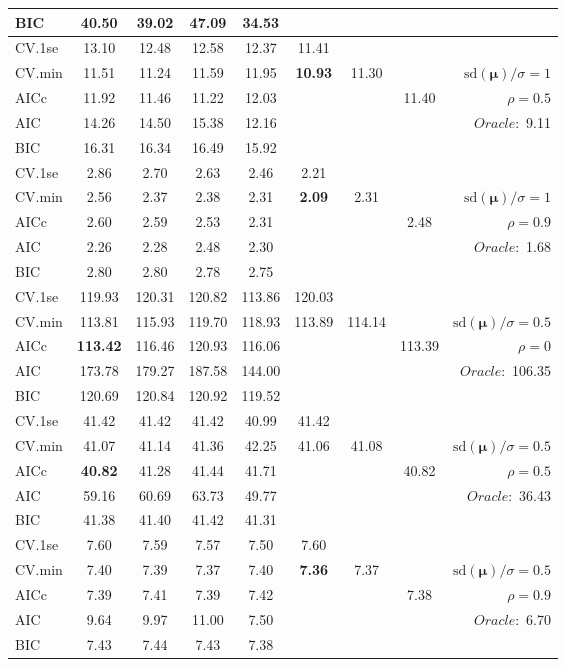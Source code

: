 \begin{table}
\begin{center}
\begin{tabular}{l*{7}{c}|r}
BIC & 40.50 & 39.02 & 47.09 & 34.53 & & & &  \\
 \hline 
CV.1se & 13.10 & 12.48 & 12.58 & 12.37 & 11.41 & & & \\
CV.min & 11.51 & 11.24 & 11.59 & 11.95 & {\bf 10.93} & 11.30 & & $\mathrm{sd}(\mathbf{\mu})/\sigma=1$ \\
AICc & 11.92 & 11.46 & 11.22 & 12.03 & & & 11.40 &  $\rho=0.5$ \\
AIC & 14.26 & 14.50 & 15.38 & 12.16 & & & &  \multirow{2}{*}{$Oracle: $ 9.11} \\
BIC & 16.31 & 16.34 & 16.49 & 15.92 & & & &  \\
 \hline 
CV.1se & 2.86 & 2.70 & 2.63 & 2.46 & 2.21 & & & \\
CV.min & 2.56 & 2.37 & 2.38 & 2.31 & {\bf 2.09} & 2.31 & & $\mathrm{sd}(\mathbf{\mu})/\sigma=1$ \\
AICc & 2.60 & 2.59 & 2.53 & 2.31 & & & 2.48 &  $\rho=0.9$ \\
AIC & 2.26 & 2.28 & 2.48 & 2.30 & & & &  \multirow{2}{*}{$Oracle: $ 1.68} \\
BIC & 2.80 & 2.80 & 2.78 & 2.75 & & & &  \\
 \hline 
CV.1se & 119.93 & 120.31 & 120.82 & 113.86 & 120.03 & & & \\
CV.min & 113.81 & 115.93 & 119.70 & 118.93 & 113.89 & 114.14 & & $\mathrm{sd}(\mathbf{\mu})/\sigma=0.5$ \\
AICc & {\bf 113.42} & 116.46 & 120.93 & 116.06 & & & 113.39 &  $\rho=0$ \\
AIC & 173.78 & 179.27 & 187.58 & 144.00 & & & &  \multirow{2}{*}{$Oracle: $ 106.35} \\
BIC & 120.69 & 120.84 & 120.92 & 119.52 & & & &  \\
 \hline 
CV.1se & 41.42 & 41.42 & 41.42 & 40.99 & 41.42 & & & \\
CV.min & 41.07 & 41.14 & 41.36 & 42.25 & 41.06 & 41.08 & & $\mathrm{sd}(\mathbf{\mu})/\sigma=0.5$ \\
AICc & {\bf 40.82} & 41.28 & 41.44 & 41.71 & & & 40.82 &  $\rho=0.5$ \\
AIC & 59.16 & 60.69 & 63.73 & 49.77 & & & &  \multirow{2}{*}{$Oracle: $ 36.43} \\
BIC & 41.38 & 41.40 & 41.42 & 41.31 & & & &  \\
 \hline 
CV.1se & 7.60 & 7.59 & 7.57 & 7.50 & 7.60 & & & \\
CV.min & 7.40 & 7.39 & 7.37 & 7.40 & {\bf 7.36} & 7.37 & & $\mathrm{sd}(\mathbf{\mu})/\sigma=0.5$ \\
AICc & 7.39 & 7.41 & 7.39 & 7.42 & & & 7.38 &  $\rho=0.9$ \\
AIC & 9.64 & 9.97 & 11.00 & 7.50 & & & &  \multirow{2}{*}{$Oracle: $ 6.70} \\
BIC & 7.43 & 7.44 & 7.43 & 7.38 & & & &  \\
 \hline 
\end{tabular}
\end{center}
\vspace{-1cm}
\end{table}






